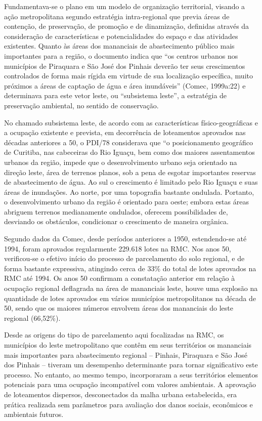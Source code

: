 	
	Fundamentava-se o plano em um modelo de organização territorial, visando a ação metropolitana segundo estratégia intra-regional que previa áreas de contenção, de preservação, de promoção e de dinamização, definidas através da consideração de características e potencialidades do espaço e das atividades existentes. Quanto às áreas dos mananciais de abastecimento público mais importantes para a região, o documento indica que “os centros urbanos nos municípios de Piraquara e São José dos Pinhais deverão ter seus crescimentos controlados de forma mais rígida em virtude de sua localização específica, muito próximos a áreas de captação de água e área inundáveis” (Comec, 1999a:22) e determinava para este vetor leste, ou “subsistema leste”, a estratégia de preservação ambiental, no sentido de conservação. 
	
	No chamado subsistema leste, de acordo com as características físico-geográficas e a ocupação existente e prevista, em decorrência de loteamentos aprovados nas décadas anteriores a 50, o PDI/78 considerava que “o posicionamento geográfico de Curitiba, nas cabeceiras do Rio Iguaçu, bem como dos maiores assentamentos urbanos da região, impede que o desenvolvimento urbano seja orientado na direção leste, área de terrenos planos, sob a pena de esgotar importantes reservas de abastecimento de água. Ao sul o crescimento é limitado pelo Rio Iguaçu e suas áreas de inundações. Ao norte, por uma topografia bastante ondulada. Portanto, o desenvolvimento urbano da região é orientado para oeste; embora estas áreas abriguem terrenos medianamente ondulados, oferecem possibilidades de, desviando os obstáculos, condicionar o crescimento de maneira orgânica.
	
	Segundo dados da Comec, desde períodos anteriores a 1950, estendendo-se até 1994, foram aprovados regularmente 229.618 lotes na RMC. Nos anos 50, verificou-se o efetivo início do processo de parcelamento do solo regional, e de forma bastante expressiva, atingindo cerca de 33\% do total de lotes aprovados na RMC até 1994. Os anos 50 confirmam a constatação anterior em relação à ocupação regional deflagrada na área de mananciais leste,  houve uma explosão na quantidade de lotes aprovados em vários municípios metropolitanos na década de 50, sendo que os maiores números envolvem áreas dos mananciais do leste regional (66,52\%).
	
	Desde as origens do tipo de parcelamento aqui focalizadas na RMC, os municípios do leste metropolitano que contêm em seus territórios os mananciais mais importantes para abastecimento regional – Pinhais, Piraquara e São José dos Pinhais – tiveram um desempenho determinante para tornar significativo este processo. No entanto, ao mesmo tempo, incorporaram a seus territórios elementos potenciais para uma ocupação incompatível com valores ambientais. A aprovação de loteamentos dispersos, desconectados da malha urbana estabelecida, era prática realizada sem parâmetros para avaliação dos danos sociais, econômicos e ambientais futuros.
	
